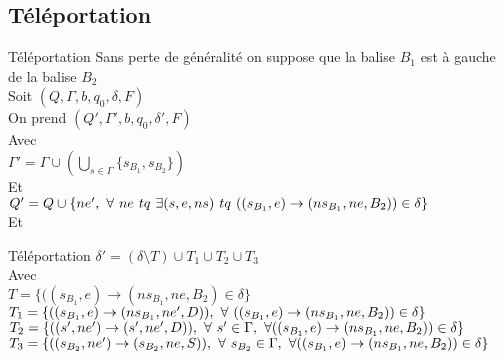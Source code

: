 \documentclass[12pt]{beamer}
\begin{document}
\subsection{Téléportation}
\begin{frame}{Téléportation}
    Sans perte de généralité on suppose que la balise $B_1$ est à gauche de la balise $B_2$\\
    Soit $(Q, \Gamma, b, q_0, \delta, F)$\\
    On prend $(Q', \Gamma', b, q_0, \delta', F)$\\
    Avec\\
    $\Gamma' = \Gamma \cup (\bigcup\limits_{s\in\Gamma} \{s_{B_1}, s_{B_2}\})$\\
    Et\\
    $Q' = Q \cup \{ne',\hspace{0.125cm}\forall \hspace{0.125cm} ne \hspace{0.125cm} tq \hspace{0.125cm} \exists (s,e,ns) \hspace{0.125cm} tq  \hspace{0.125cm} ((s_{B_1},e)\rightarrow(ns_{B_1},ne,B_2)) \in \delta\} $ \\
    Et\\
\end{frame}
\begin{frame}{Téléportation}
    $\delta' = (\delta\setminus T) \cup T_1 \cup T_2 \cup T_3$\\
    Avec\\
    $T = \{((s_{B_1},e)\rightarrow(ns_{B_1},ne,B_2) \in \delta \}$ \\
    $T_1 = \{((s_{B_1},e)\rightarrow(ns_{B_1},ne',D)),\hspace{0.125cm}
    \forall \hspace{0.125cm} ((s_{B_1},e)\rightarrow(ns_{B_1},ne,B_2)) \in \delta\}$\\
    $T_2 = \{((s',ne')\rightarrow(s',ne',D)),\hspace{0.125cm}\forall \hspace{0.125cm} s' \in \Gamma, \hspace{0.125cm} \forall((s_{B_1},e)\rightarrow(ns_{B_1},ne,B_2)) \in \delta\}$\\
    $T_3 = \{((s_{B_2},ne')\rightarrow(s_{B_2},ne,S)),\hspace{0.125cm}\forall \hspace{0.125cm} s_{B_2} \in \Gamma, \hspace{0.125cm} \forall((s_{B_1},e)\rightarrow(ns_{B_1},ne,B_2)) \in \delta\}$\\
\end{frame}
\end{document}
